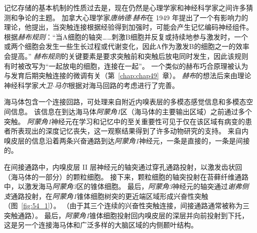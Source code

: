 记忆存储的基本机制的性质过去是，现在仍然是心理学家和神经科学家之间许多猜测和争论的主题。
加拿大心理学家\textit{唐纳德$\cdot$赫布}在 1949 年提出了一个有影响力的理论，他提出，当突触连接根据经验得到加强时，可能会产生记忆编码神经组件。
根据\textit{赫布规则}：“当A细胞的轴突……刺激B细胞并反复或持续地参与激发时，一个或两个细胞会发生一些生长过程或代谢变化，因此A作为激发B的细胞之一的效率会提高。”
\textit{赫布规则}的关键要素是要求突触前和突触后放电同时发生，因此该规则有时被改写为“一起放电的细胞，连接在一起”。
一个类似的赫布巧合原理被认为与发育后期突触连接的微调有关（第~\ref{chap:chap49}~章）。
\textit{赫布}的想法后来由理论神经科学家\textit{大卫$\cdot$马尔}根据对海马回路的考虑进行了完善。


海马体包含一个连接回路，可处理来自附近内嗅表层的多模态感觉信息和多模态空间信息。
该信息在到达海马体\textit{阿蒙角1}区（海马体的主要输出区域）之前通过多个突触。
\textit{阿蒙角1}神经元在学习和记忆中的至关重要性可见于仅在该区域有病变的患者所表现出的深度记忆丧失，这一观察结果得到了许多动物研究的支持。
来自内嗅皮层的信息沿着两条兴奋通路到达\textit{阿蒙角1}神经元，一条是直接的，一条是间接的。


在间接通路中，内嗅皮层 II 层神经元的轴突通过穿孔通路投射，以激发齿状回（海马体的一部分）的颗粒细胞。
接下来，颗粒细胞的轴突投射在苔藓纤维通路中，以激发海马\textit{阿蒙角3}区的锥体细胞。
最后，\textit{阿蒙角3}神经元的轴突通过\textit{谢弗侧支}通路投射，在\textit{阿蒙角1}锥体细胞树突的更近端区域形成兴奋性突触（图~\ref{fig:54_1}）。
（由于其三个连续的兴奋性突触连接，间接通路通常被称为三突触通路）。
最后，\textit{阿蒙角1}锥体细胞投射回内嗅皮层的深层并向前投射到下托，这是另一个连接海马体和广泛多样的大脑区域的内侧颞叶结构。


